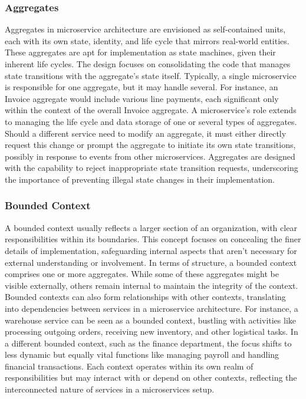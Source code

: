\subsubsection{Aggregates}
Aggregates in microservice architecture are envisioned as self-contained units, each with its own
state, identity, and life cycle that mirrors real-world entities. These aggregates are apt for
implementation as state machines, given their inherent life cycles. The design focuses on
consolidating the code that manages state transitions with the aggregate's state itself. Typically,
a single microservice is responsible for one aggregate, but it may handle several. For instance, an
Invoice aggregate would include various line payments, each significant only within the context of
the overall Invoice aggregate.
\newline\newline
A microservice's role extends to managing the life cycle and data storage of one or several types of
aggregates. Should a different service need to modify an aggregate, it must either directly request
this change or prompt the aggregate to initiate its own state transitions, possibly in response to
events from other microservices. Aggregates are designed with the capability to reject inappropriate
state transition requests, underscoring the importance of preventing illegal state changes in their
implementation.

\subsubsection{Bounded Context}
A bounded context usually reflects a larger section of an organization, with clear responsibilities
within its boundaries. This concept focuses on concealing the finer details of implementation,
safeguarding internal aspects that aren't necessary for external understanding or involvement.
\newline\newline
In terms of structure, a bounded context comprises one or more aggregates. While some of these
aggregates might be visible externally, others remain internal to maintain the integrity of the
context. Bounded contexts can also form relationships with other contexts, translating into
dependencies between services in a microservice architecture.
\newline\newline
For instance, a warehouse service can be seen as a bounded context, bustling with activities like
processing outgoing orders, receiving new inventory, and other logistical tasks. In a different
bounded context, such as the finance department, the focus shifts to less dynamic but equally vital
functions like managing payroll and handling financial transactions. Each context operates within
its own realm of responsibilities but may interact with or depend on other contexts, reflecting the
interconnected nature of services in a microservices setup.

